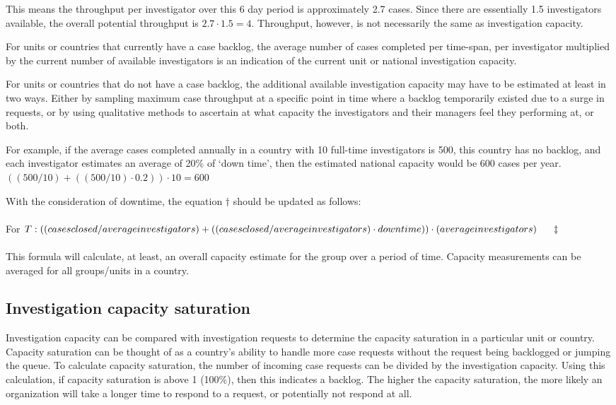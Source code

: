 \documentclass[10pt,a4paper]{article}
\begin{document}
This means the throughput per investigator over this 6 day period is approximately 2.7 cases. Since there are essentially 1.5 investigators available, the overall potential throughput is $2.7 \cdot 1.5 = 4$. Throughput, however, is not necessarily the same as investigation capacity.

For units or countries that currently have a case backlog, the average number of cases completed per time-span, per investigator multiplied by the current number of available investigators is an indication of the current unit or national investigation capacity.

For units or countries that do not have a case backlog, the additional available investigation capacity may have to be estimated at least in two ways. Either by sampling maximum case throughput at a specific point in time where a backlog temporarily existed due to a surge in requests, or by using qualitative methods to ascertain at what capacity the investigators and their managers feel they performing at, or both.

For example, if the average cases completed annually in a country with 10 full-time investigators is 500, this country has no backlog, and each investigator estimates an average of 20\% of `down time', then the estimated national capacity would be 600 cases per year. $((500/10)+((500/10)\cdot 0.2)) \cdot 10 = 600$

With the consideration of downtime, the equation $\dagger$ should be updated as follows:
\\
\\
For $T: ((cases closed/average investigators)+\\((cases closed/average investigators) \cdot down time)) \cdot (average investigators)\hspace{.05\textwidth}\ddagger$
\\
\\
This formula will calculate, at least, an overall capacity estimate for the group over a period of time. Capacity measurements can be averaged for all groups/units in a country.

\subsection{Investigation capacity saturation}
Investigation capacity can be compared with investigation requests to determine the capacity saturation in a particular unit or country. Capacity saturation can be thought of as a country's ability to handle more case requests without the request being backlogged or jumping the queue. To calculate capacity saturation, the number of incoming case requests can be divided by the investigation capacity. Using this calculation, if capacity saturation is above 1 (100\%), then this indicates a backlog. The higher the capacity saturation, the more likely an organization will take a longer time to respond to a request, or potentially not respond at all.
\end{document}

